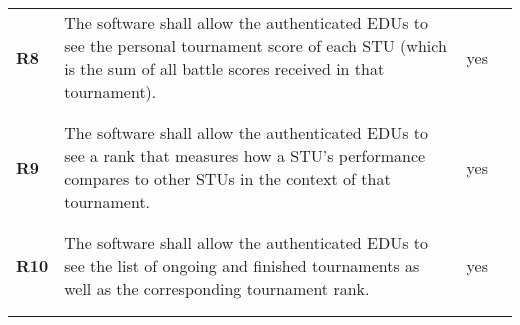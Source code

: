 \begin{longtable}[H]{l p{6.5cm} l p{3cm}}
    \textbf{R8}  & The software shall allow the authenticated EDUs to see the personal tournament score of each STU (which is the sum of all battle scores received in that tournament).                                                                                                    & {\color{green}yes}   &                                                                                         \\
                 &                                                                                                                                                                                                                                                                          &                      &                                                                                         \\\hline & & & \\
    \textbf{R9}  & The software shall allow the authenticated EDUs to see a rank that measures how a STU's performance compares to other STUs in the context of that tournament.                                                                                                            & {\color{green}yes}   &                                                                                         \\
                 &                                                                                                                                                                                                                                                                          &                      &                                                                                         \\\hline & & & \\
    \textbf{R10} & The software shall allow the authenticated EDUs to see the list of ongoing and finished tournaments as well as the corresponding tournament rank.                                                                                                                        & {\color{green}yes}   &                                                                                         \\
                 &                                                                                                                                                                                                                                                                          &                      &                                                                                         \\\hline & & & \\

\end{longtable}
